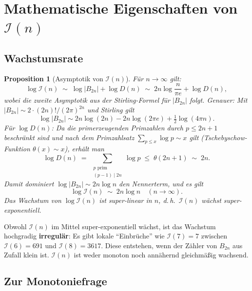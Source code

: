 \documentclass[12pt,a4paper]{article}
\newtheorem{proposition}[definition]{Proposition}
\newcommand{\abs}[1]{\lvert#1\rvert}
\newcommand{\In}{\mathcal{I}}      %
\newcommand{\Denom}[1]{D(#1)}     %
\begin{document}
\section{Mathematische Eigenschaften von \texorpdfstring{$\In(n)$}{I(n)}}
\label{sec:eigenschaften}

\subsection{Wachstumsrate}

\begin{proposition}[Asymptotik von $\In(n)$]
\label{prop:wachstum}
Für $n \to \infty$ gilt:
\[
  \log \In(n) \;\sim\; \log\abs{B_{2n}} + \log \Denom{n}
              \;\sim\; 2n\log\frac{n}{\pi e} + \log \Denom{n},
\]
wobei die zweite Asymptotik aus der Stirling-Formel für $\abs{B_{2n}}$ folgt.
Genauer: Mit $\abs{B_{2n}} \sim 2\cdot (2n)!/(2\pi)^{2n}$ und Stirling gilt
\[
  \log\abs{B_{2n}} \sim 2n\log(2n) - 2n\log(2\pi e) + \tfrac{1}{2}\log(4\pi n).
\]
Für $\log \Denom{n}$: Da die primerzeugenden Primzahlen durch $p\leq 2n+1$ beschränkt
sind und nach dem Primzahlsatz $\sum_{p\leq x}\log p \sim x$ gilt (Tschebyschow-Funktion
$\theta(x) \sim x$), erhält man
\[
  \log \Denom{n} \;=\; \sum_{\substack{p \text{ prim}\\(p-1)\mid 2n}} \log p
  \;\leq\; \theta(2n+1) \;\sim\; 2n.
\]
Damit dominiert $\log\abs{B_{2n}} \sim 2n\log n$ den Nennerterm, und es gilt
\[
  \log \In(n) \;\sim\; 2n\log n \quad (n\to\infty).
\]
Das Wachstum von $\log \In(n)$ ist \emph{super-linear} in $n$, d.\,h.\
$\In(n)$ wächst \emph{super-exponentiell}.
\end{proposition}

\begin{tcolorbox}[warnung, title={Unregelmäßigkeit des Wachstums}]
Obwohl $\In(n)$ im Mittel super-exponentiell wächst, ist das Wachstum
hochgradig \textbf{irregulär}: Es gibt lokale ``Einbrüche'' wie
$\In(7) = 7$ zwischen $\In(6) = 691$ und $\In(8) = 3617$.
Diese entstehen, wenn der Zähler von $B_{2n}$ aus Zufall klein ist.
$\In(n)$ ist weder monoton noch annähernd gleichmäßig wachsend.
\end{tcolorbox}

\subsection{Zur Monotoniefrage}
\end{document}
